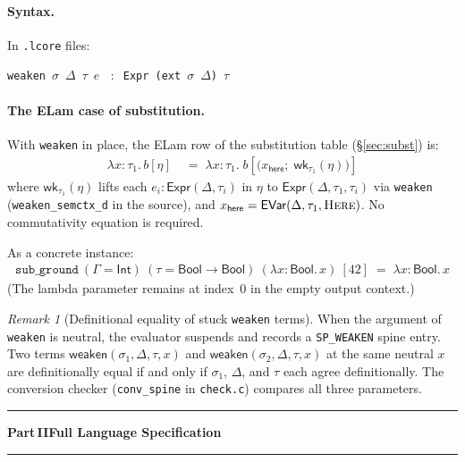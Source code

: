 \documentclass[10pt,a4paper]{article}
\newcommand{\TInt}{\mathsf{Int}}
\newcommand{\TBool}{\mathsf{Bool}}
\newcommand{\subst}[2]{#1[#2]}
\theoremstyle{plain}
\theoremstyle{definition}
\theoremstyle{remark}
\newtheorem{remark}{Remark}
\begin{document}
\paragraph{Syntax.} In \texttt{.lcore} files:
\begin{center}
\texttt{weaken}\ $\sigma$\ $\Delta$\ $\tau$\ $e$
$\;\;:\;\;$\texttt{Expr (ext}~$\sigma$~$\Delta$\texttt{)}~$\tau$
\end{center}

\paragraph{The ELam case of substitution.}
With \texttt{weaken} in place, the ELam row of the substitution table
(\S\ref{sec:subst}) is:
\begin{align*}
  \subst{\lambda x{:}\tau_1.\,b}{\eta}
  &\;=\;
  \lambda x{:}\tau_1.\;
  \subst{b}{\bigl(x_{\mathsf{here}};\;\mathsf{wk}_{\tau_1}(\eta)\bigr)}
\end{align*}
where $\mathsf{wk}_{\tau_1}(\eta)$ lifts each $e_i:\mathsf{Expr}(\Delta,\tau_i)$
in $\eta$ to $\mathsf{Expr}(\Delta,\tau_1,\tau_i)$ via \texttt{weaken}
(\texttt{weaken\_semctx\_d} in the source), and
$x_{\mathsf{here}}=\mathsf{EVar}(\Delta,\tau_1,\textsc{Here})$.
No commutativity equation is required.

As a concrete instance:
\begin{align*}
\texttt{sub\_ground}\ (\Gamma{=}\TInt)\ (\tau{=}\TBool{\to}\TBool)
\ (\lambda x{:}\TBool.\,x)\ [42]
\;=\;
\lambda x{:}\TBool.\,x
\end{align*}
(The lambda parameter remains at index~0 in the empty output context.)

\begin{remark}[Definitional equality of stuck \texttt{weaken} terms]
When the argument of \texttt{weaken} is neutral, the evaluator suspends
and records a \texttt{SP\_WEAKEN} spine entry.  Two terms
$\mathsf{weaken}(\sigma_1,\Delta,\tau,x)$ and
$\mathsf{weaken}(\sigma_2,\Delta,\tau,x)$ at the same neutral $x$ are
definitionally equal if and only if $\sigma_1$, $\Delta$, and $\tau$
each agree definitionally.  The conversion checker (\texttt{conv\_spine}
in \texttt{check.c}) compares all three parameters.
\end{remark}


\medskip\noindent\rule{\linewidth}{0.4pt}
{\centering\normalsize\bfseries Part\,II\quad Full Language Specification\par}
\noindent\rule{\linewidth}{0.4pt}\medskip
\end{document}
